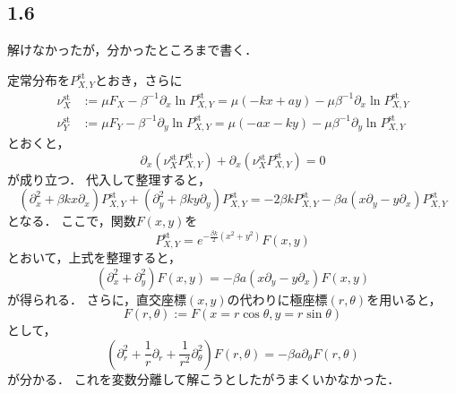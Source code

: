 \documentclass[a4paper,11pt]{jsarticle}
\begin{document}
\subsection*{1.6}
解けなかったが，分かったところまで書く．

定常分布を$P_{X,Y}^{\mathrm{st}}$とおき，さらに
\begin{align}
  \nu_X^{\mathrm{st}} &:= \mu F_X - \beta^{-1}\partial_x \ln{P_{X,Y}^{\mathrm{st}}} = \mu (-kx+ay) - \mu\beta^{-1}\partial_x \ln{P_{X,Y}^{\mathrm{st}}} \\
  \nu_Y^{\mathrm{st}} &:= \mu F_Y - \beta^{-1}\partial_y \ln{P_{X,Y}^{\mathrm{st}}} = \mu (-ax-ky) - \mu\beta^{-1}\partial_y \ln{P_{X,Y}^{\mathrm{st}}}
\end{align}
とおくと，
\begin{equation}
  \partial_x(\nu_X^{\mathrm{st}} P_{X,Y}^{\mathrm{st}}) + \partial_x(\nu_X^{\mathrm{st}} P_{X,Y}^{\mathrm{st}}) = 0
\end{equation}
が成り立つ．
代入して整理すると，
\begin{equation}
  (\partial_x^2 + \beta kx\partial_x) P_{X,Y}^{\mathrm{st}} +(\partial_y^2 + \beta ky\partial_y) P_{X,Y}^{\mathrm{st}}= -2\beta k P_{X,Y}^{\mathrm{st}} - \beta a(x\partial_y - y\partial_x)P_{X,Y}^{\mathrm{st}}
\end{equation}
となる．
ここで，関数$F(x,y)$を
\begin{equation}
  P_{X,Y}^{\mathrm{st}} = e^{-\frac{\beta k}{2} (x^2+y^2)} F(x,y)
\end{equation}
とおいて，上式を整理すると，
\begin{equation}
  (\partial_x^2 + \partial_y^2) F(x,y) = - \beta a(x\partial_y - y\partial_x) F(x,y)
\end{equation}
が得られる．
さらに，直交座標$(x,y)$の代わりに極座標$(r,\theta)$を用いると，
\begin{equation}
  F(r,\theta) := F(x=r\cos{\theta}, y=r\sin{\theta})
\end{equation}
として，
\begin{equation}
  \left(\partial_r^2 + \frac{1}{r}\partial_r + \frac{1}{r^2}\partial_{\theta}^2\right) F(r,\theta) = - \beta a\partial_{\theta} F(r,\theta)
\end{equation}
が分かる．
これを変数分離して解こうとしたがうまくいかなかった．
\end{document}

